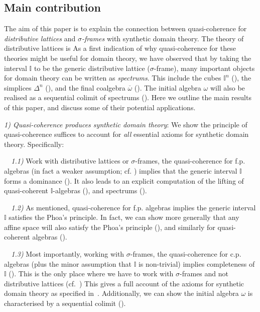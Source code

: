 \documentclass[12pt]{amsart}
\theoremstyle{definition}
\newcommand{\mbb}[1]{\mathbb{#1}}
\newcommand{\I}{\mbb I}
\newcommand{\ov}[1]{\overline{#1}}
\begin{document}
\subsection{Main contribution}

The aim of this paper is to explain the connection between quasi-coherence for \emph{distributive lattices} and \emph{$\sigma$-frames} with synthetic domain theory. The theory of distributive lattices is  As a first indication of why quasi-coherence for these theories might be useful for domain theory, we have observed that by taking the interval $\I$ to be the generic distributive lattice ($\sigma$-frame), many important objects for domain theory can be written as \emph{spectrums}. This include the cubes $\I^n$ (), the simplices $\Delta^n$ (), and the final coalgebra $\ov\omega$ (). The initial algebra $\omega$ will also be realised as a sequential colimit of spectrums (). Here we outline the main results of this paper, and discuss some of their potential applications.

\emph{1) Quasi-coherence produces synthetic domain theory}: We show the principle of quasi-coherence suffices to account for \emph{all} essential axioms for synthetic domain theory. Specifically:

\emph{\ \ 1.1)} Work with distributive lattices or $\sigma$-frames, the quasi-coherence for f.p. algebras (in fact a weaker assumption; cf. ) implies that the generic interval $\I$ forms a dominance (). It also leads to an explicit computation of the lifting of quasi-coherent $\I$-algebras (), and spectrums ().

\emph{\ \ 1.2)} As mentioned, quasi-coherence for f.p. algebras implies the generic interval $\I$ satisfies the Phoa's principle. In fact, we can show more generally that any affine space will also satisfy the Phoa's principle (), and similarly for quasi-coherent algebras ().

\emph{\ \ 1.3)} Most importantly, working with $\sigma$-frames, the quasi-coherence for c.p. algebras (plus the minor assumption that $\I$ is non-trivial) implies completeness of $\I$ (). This is the only place where we have to work with $\sigma$-frames and not distributive lattices (cf.~) This gives a full account of the axioms for synthetic domain theory as specified in~\cite{hyland2006first}. Additionally, we can show the initial algebra $\omega$ is characterised by a sequential colimit ().
\end{document}
